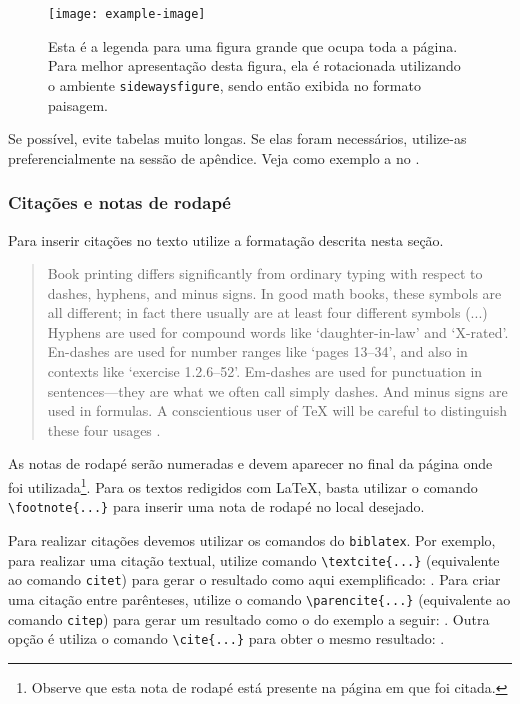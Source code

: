 \documentclass[portuguese]{textolivre}
\begin{document}
\begin{sidewaysfigure}
\centering
\texttt{[image: example-image]}
\caption{Esta é a legenda para uma figura grande que ocupa toda a página. Para melhor apresentação desta figura, ela é rotacionada utilizando o ambiente \texttt{sidewaysfigure}, sendo então exibida no formato paisagem.}
\label{fig:landscape}
\end{sidewaysfigure}

Se possível, evite tabelas muito longas. Se elas foram necessários, utilize-as preferencialmente na sessão de apêndice. 
Veja como exemplo a  no .


\subsubsection{Citações e notas de rodapé}\label{sec-quotesandfootnotes}
Para inserir citações no texto utilize a formatação descrita nesta seção.

\begin{quote}
Book printing differs significantly from ordinary typing with respect to dashes, hyphens, and minus signs.
In good math books, these symbols are all different; in fact there usually are at least four different symbols (...)
Hyphens are used for compound words like `daughter-in-law' and `X-rated'. En-dashes are used for number ranges like
`pages 13--34', and also in contexts like `exercise 1.2.6--52'.
Em-dashes are used for punctuation in sentences---they are what we often call simply dashes.
And minus signs are used in formulas. A conscientious user of \TeX{} will be careful to distinguish these four usages
\cite[p. 4]{donaldknuth1984}.
\end{quote}

As notas de rodapé serão numeradas e devem aparecer no final da página onde foi utilizada\footnote{
Observe que esta nota de rodapé está presente na página em que foi citada.}. Para os textos
redigidos com \LaTeX{}, basta utilizar o comando \verb|\footnote{...}| para inserir uma nota de rodapé
no local desejado.

Para realizar citações devemos utilizar os comandos do \texttt{biblatex}. Por exemplo, para realizar uma
citação textual, utilize comando \verb|\textcite{...}| (equivalente ao comando \texttt{citet}) para gerar o
resultado como aqui exemplificado: \textcite{donaldknuth1984}.
Para criar uma citação entre parênteses, utilize o comando \verb|\parencite{...}| (equivalente ao comando \texttt{citep})
para gerar um resultado como o do exemplo a seguir: \parencite{donaldknuth1984}.
Outra opção é utiliza o comando \verb|\cite{...}| para obter o mesmo resultado: \cite{donaldknuth1984}.
\end{document}
